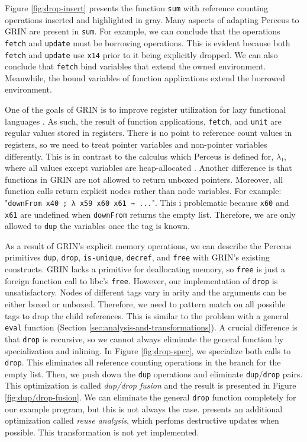 \documentclass[10pt, twocolumn]{article}
\begin{document}
Figure \ref{fig:drop-insert} presents the function \lstinline{sum} with reference counting operations inserted and highlighted in gray.
Many aspects of adapting Perceus to GRIN are present in \lstinline{sum}. 
For example, we can conclude that the operations \lstinline{fetch} and \lstinline{update} must be borrowing operations. 
This is evident because both \lstinline{fetch} and \lstinline{update} use \lstinline{x14} prior to it being explicitly dropped.
We can also conclude that \lstinline{fetch} bind variables that extend the owned environment.
Meanwhile, the bound variables of function applications extend the borrowed environment.

One of the goals of GRIN is to improve register utilization for lazy functional languages \citep{boquist1999}.
As such, the result of function applications, \lstinline{fetch}, and \lstinline{unit} are regular values stored in registers.
There is no point to reference count values in registers, so we need to treat pointer variables and non-pointer variables differently.
This is in contrast to the calculus which Perceus is defined for, $λ₁$, where all values except variables are heap-allocated \citep{reinking2021}.
Another difference is that functions in GRIN are not allowed to return unboxed pointers. 
Moreover, all function calls return explicit nodes rather than node variables. 
For example: "\lstinline{downFrom x40 ; λ x59 x60 x61 → ...}".
This i problematic because \lstinline{x60} and \lstinline{x61} are undefined when \lstinline{downFrom} returns the empty list.
Therefore, we are only allowed to \lstinline{dup} the variables once the tag is known.

As a result of GRIN's explicit memory operations, we can describe the Perceus primitives \lstinline{dup}, \lstinline{drop}, \lstinline{is-unique}, \lstinline{decref}, and \lstinline{free} with GRIN's existing constructs.
GRIN lacks a primitive for deallocating memory, so \lstinline{free} is just a foreign function call to libc's \lstinline{free}. 
However, our implementation of \lstinline{drop} is unsatisfactory. 
Nodes of different tags vary in arity and the arguments can be either boxed or unboxed.
Therefore, we need to pattern match on all possible tags to drop the child references. 
This is similar to the problem with a general \lstinline{eval} function (Section \ref{sec:analysis-and-transformations}). 
A crucial difference is that \lstinline{drop} is recursive, so we cannot always eliminate the general function by specialization and inlining.
In Figure \ref{fig:drop-spec}, we specialize both calls to \lstinline{drop}.
This eliminates all reference counting operations in the branch for the empty list.
Then, we push down the \lstinline{dup} operations and eliminate \lstinline{dup}/\lstinline{drop} pairs.
This optimization is called \emph{dup/drop fusion} and the result is presented in Figure \ref{fig:dup/drop-fusion}.
We can eliminate the general \lstinline{drop} function completely for our example program, but this is not always the case. 
\citeauthor{reinking2021} presents an additional optimization called \emph{reuse analysis}, which perfoms destructive updates when possible.
This transformation is not yet implemented.
\end{document}
